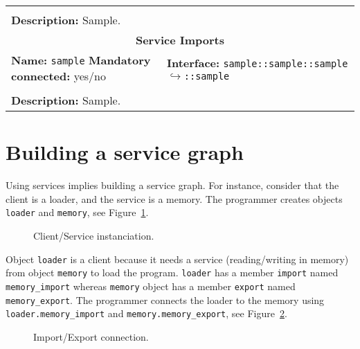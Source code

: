 \begin{center}
\begin{tabular}{|p{7.5cm}|p{7.5cm}|}
		\multicolumn{2}{|l|}{}\\
		\multicolumn{2}{|p{15cm}|}{\textbf{Description:} \newline Sample.}\\
		\hline
		\hline
		\multicolumn{2}{|c|}{\textbf{\large Service Imports}}\\
		\hline
		\multicolumn{1}{|p{7.5cm}}{\textbf{Name:} \texttt{sample} \newline \textbf{Mandatory connected:} yes/no} & \multicolumn{1}{p{7.5cm}|}{\textbf{Interface:} \newline \texttt{sample::sample::sample} \newline$\hookrightarrow$\texttt{::sample}}\\
		\multicolumn{2}{|l|}{}\\
		\multicolumn{2}{|p{15cm}|}{\textbf{Description:} \newline Sample.}\\
		\hline
	\end{tabular}
\end{center}

\section{Building a service graph}
\label{building_a_service_graph}

Using services implies building a service graph.
For instance, consider that the client is a loader, and the service is a memory.
The programmer creates objects \texttt{loader} and \texttt{memory}, see Figure~\ref{fig:instanciation}.

\begin{figure}[h]
  \begin{center}
    
    \caption{\label{fig:instanciation} Client/Service instanciation.}
  \end{center}
\end{figure}

Object \texttt{loader} is a client because it needs a service (reading/writing in memory) from object \texttt{memory} to load the program.
\texttt{loader} has a member \texttt{import} named \texttt{memory\_import} whereas \texttt{memory} object has a member \texttt{export} named \texttt{memory\_export}.
The programmer connects the loader to the memory using \texttt{loader.memory\_import} and \texttt{memory.memory\_export}, see Figure~\ref{fig:connection}.

\begin{figure}[h]
  \begin{center}
    
    \caption{\label{fig:connection} Import/Export connection.}
  \end{center}
\end{figure}

